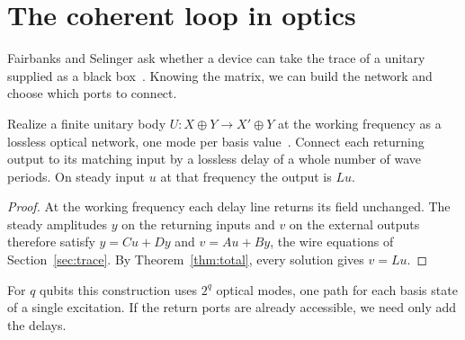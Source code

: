 \documentclass[acmsmall,screen,review,anonymous,nonacm]{acmart}
\numberwithin{equation}{section}
\begin{document}
\section{The coherent loop in optics}\label{sec:light}

Fairbanks and Selinger ask whether a device can take the trace of a unitary
supplied as a black box~\cite[App.~B]{FairbanksSelinger25Traces}. Knowing the matrix,
we can build the network and choose which ports to connect.

\begin{proposition}\label{prop:optical}
Realize a finite unitary body $U:X\oplus Y\to X'\oplus Y$ at the working frequency
as a lossless optical network, one mode per basis value~\cite{ReckEtAl94Multiport}.
Connect each returning output to its matching input by a lossless delay of a whole number
of wave periods. On steady input $u$ at that frequency the output is $Lu$.
\end{proposition}

\begin{proof}
At the working frequency each delay line returns its field unchanged.
The steady amplitudes $y$ on the returning inputs and $v$ on the
external outputs therefore satisfy $y=Cu+Dy$ and $v=Au+By$, the wire
equations of Section~\ref{sec:trace}. By Theorem~\ref{thm:total},
every solution gives $v=Lu$.
\end{proof}

For $q$ qubits this construction uses $2^q$ optical modes, one path for each basis state
of a single excitation. If the return ports are already accessible, we need only add the
delays.
\end{document}
